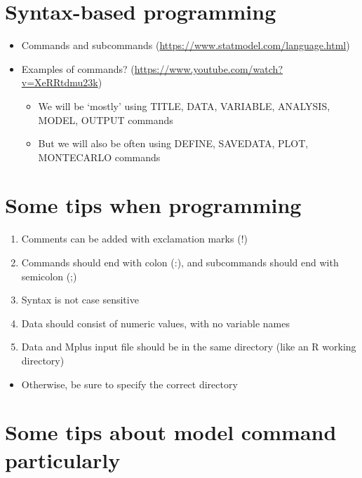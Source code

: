\documentclass[
]{book}
\providecommand{\tightlist}{%
  \setlength{\itemsep}{0pt}\setlength{\parskip}{0pt}}
\begin{document}
\hypertarget{syntax-based-programming}{%
\section{Syntax-based programming}\label{syntax-based-programming}}

\begin{itemize}
\item
  Commands and subcommands (\url{https://www.statmodel.com/language.html})
\item
  Examples of commands? (\url{https://www.youtube.com/watch?v=XeRRtdmu23k})

  \begin{itemize}
  \tightlist
  \item
    We will be `mostly' using TITLE, DATA, VARIABLE, ANALYSIS, MODEL, OUTPUT commands
  \item
    But we will also be often using DEFINE, SAVEDATA, PLOT, MONTECARLO commands
  \end{itemize}
\end{itemize}

\hypertarget{some-tips-when-programming}{%
\section{Some tips when programming}\label{some-tips-when-programming}}

\begin{enumerate}
\def\labelenumi{\arabic{enumi}.}
\item
  Comments can be added with exclamation marks (!)
\item
  Commands should end with colon (:), and subcommands should end with semicolon (;)
\item
  Syntax is not case sensitive
\item
  Data should consist of numeric values, with no variable names
\item
  Data and Mplus input file should be in the same directory (like an R working directory)
\end{enumerate}

\begin{itemize}
\tightlist
\item
  Otherwise, be sure to specify the correct directory
\end{itemize}

\hypertarget{some-tips-about-model-command-particularly}{%
\section{Some tips about model command particularly}\label{some-tips-about-model-command-particularly}}
\end{document}
